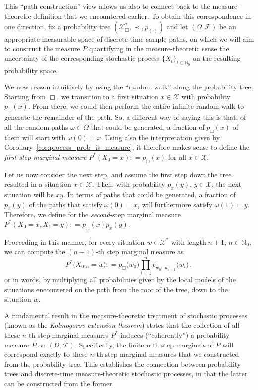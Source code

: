 \documentclass[graybox]{svmult}
\newcommand{\nats}{\mathbb{N}}
\newcommand{\natswith}{\nats_{0}}
\newcommand{\states}{\mathcal{X}}
\newcommand{\coloneqq}{:\!=}
\begin{document}
This ``path construction'' view allows us also to connect back to the measure-theoretic definition that we encountered earlier. To obtain this correspondence in one direction, fix a probability tree $(\states^*_\Box,\prec, p_{(\cdot)})$ and let $(\Omega,\mathcal{F})$ be an appropriate measurable space of discrete-time sample paths, on which we will aim to construct the measure $P$ quantifying in the measure-theoretic sense the uncertainty of the corresponding stochastic process $\{X_t\}_{t\in\natswith}$ on the resulting probability space.

We now reason intuitively by using the ``random walk'' along the probability tree. Starting from $\Box$, we transition to a first situation $x\in\states$ with probability $p_\Box(x)$. From there, we could then perform the entire infinite random walk to generate the remainder of the path. So, a different way of saying this is that, of all the random paths $\omega\in\Omega$ that could be generated, a fraction of $p_\Box(x)$ of them will start with $\omega(0)=x$. Using also the interpretation given by Corollary~\ref{cor:process_prob_is_measure}, it therefore makes sense to define the \emph{first-step marginal measure} $P^*(X_0=x) \coloneqq p_\Box(x)$ for all $x\in\states$.

Let us now consider the next step, and assume the first step down the tree resulted in a situation $x\in\states$. Then, with probability $p_x(y)$, $y\in\states$, the next situation will be $xy$. In terms of paths that could be generated, a fraction of $p_x(y)$ of the paths that satisfy $\omega(0)=x$, will furthermore satisfy $\omega(1)=y$. Therefore, we define for the \emph{second}-step marginal measure $P^*(X_0=x,X_1=y)\coloneqq p_\Box(x)p_x(y)$.

Proceeding in this manner, for every situation $w\in\states^*$ with length $n+1$, $n\in\natswith$, we can compute the $(n+1)$-th step marginal measure as
\begin{equation*}
P^*\bigl(X_{0:n}=w\bigr) \coloneqq p_\Box\bigl(w_0\bigr)\prod_{i=1}^{n} p_{w_0\cdots w_{i-1}}\bigl(w_i\bigr)\,,
\end{equation*}
or in words, by multiplying all probabilities given by the local models of the situations encountered on the path from the root of the tree, down to the situation $w$.

A fundamental result in the measure-theoretic treatment of stochastic processes (known as the \emph{Kolmogorov extension theorem}) states that the collection of all these $n$-th step marginal measures $P^*$ induces (``coherently'') a probability measure $P$ on $(\Omega,\mathcal{F})$. Specifically, the finite $n$-th step marginals of $P$ will correspond exactly to these $n$-th step marginal measures that we constructed from the probability tree. This establishes the connection between probability trees and discrete-time measure-theoretic stochastic processes, in that the latter can be constructed from the former.
\end{document}
